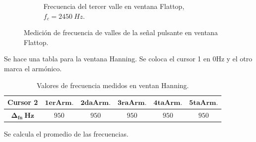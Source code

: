 \begin{figure}[H]
        \hfill
        \begin{subfigure}[H]{0.48\textwidth}
          \caption{Frecuencia del tercer valle en ventana Flattop, $f_{c}=2450~Hz$.}
        \end{subfigure}

        \caption{Medición de frecuencia de valles de la señal pulsante en ventana Flattop.}
        \label{fig:Exp2SeñalPulsanteVallesEspectro}
      \end{figure}     

      Se hace una tabla para la ventana Hanning. Se coloca el cursor 1 en 0Hz y el otro marca el 
      armónico.

      \begin{table}[H]
      \centering
        \begin{tabular}{cccccc} \hline \hline
          \textbf{Cursor 2}               &  $\mathbf{1erArm.}$       & $\mathbf{2daArm.}$        & $\mathbf{3raArm.}$  &   $\mathbf{4taArm.}$ &   $\mathbf{5taArm.}$ \\ \hline
          $\mathbf{\Delta_{fn}~Hz}$       &   $950$                        &    $950$                    &   $950$                & $950$                   & $950$                \\
         \end{tabular}
          \caption{Valores de frecuencia medidos en ventan Hanning.}
          \label{tab:Exp1MedicionesHanning}
      \end{table}

      Se calcula el promedio de las frecuencias.


